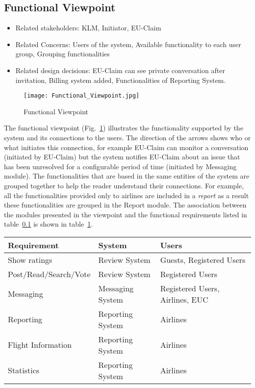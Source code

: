% 

\subsection{Functional Viewpoint}

\begin{itemize}
\item Related stakeholders: KLM, Initiator, EU-Claim
\item Related Concerns: Users of the system, Available functionality to each user group, Grouping functionalities
\item Related design decisions: EU-Claim can see private conversation after invitation, Billing system added, Functionalities of Reporting System.
\end{itemize}

\newpage
\begin{landscape}
\begin{figure}
\texttt{[image: Functional\_Viewpoint.jpg]}
\caption{Functional Viewpoint}
\label{fig:functional}
\end{figure}
\end{landscape}

The functional viewpoint (Fig.~\ref{fig:functional}) illustrates the functionality supported by the system and its connections to the users. The direction of the arrows shows who or what initiates this connection, for example EU-Claim can monitor a conversation (initiated by EU-Claim) but  the system notifies EU-Claim about an issue that has been unresolved for a configurable period of time (initiated by Messaging module). The functionalities that are based in the same entities of the system are grouped together to help the reader understand their connections. For example, all the functionalities  provided only to airlines are included in a {\em report} as a result these functionalities are grouped in the Report module. The association between the modules presented in the viewpoint and the functional requirements listed in table~\ref{} is shown in table~\ref{tab:associateSysReq}.

\begin{longtable}{| l | l | l |}
\label{tab:associateSysReq}
\textbf{Requirement} & \textbf{System} & \textbf{Users} \\ \hline
Show ratings & Review System & Guests, Registered Users \\ \hline
Post/Read/Search/Vote & Review System & Registered Users \\ \hline
Messaging & Messaging System & Registered Users, Airlines, EUC \\ \hline
Reporting  & Reporting System & Airlines \\ \hline
Flight Information & Reporting System & Airlines \\ \hline
Statistics & Reporting System & Airlines \\ \hline 

\end{longtable}

